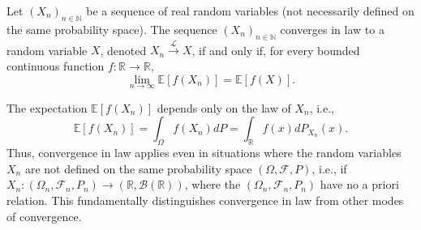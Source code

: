 \begin{definition}
Let $(X_n)_{n \in \mathbb{N}}$ be a sequence of real random variables (not necessarily defined on the same probability space). The sequence $(X_n)_{n \in \mathbb{N}}$ converges in law to a random variable $X$, denoted $X_n \xrightarrow{\mathcal{L}} X$, if and only if, for every bounded continuous function $f: \mathbb{R} \to \mathbb{R}$,
\[
\lim_{n \to \infty} \mathbb{E}[f(X_n)] = \mathbb{E}[f(X)].
\]
\end{definition}%

\begin{remark}
The expectation $\mathbb{E}[f(X_n)]$ depends only on the law of $X_n$, i.e.,
\[
\mathbb{E}[f(X_n)] = \int_{\Omega} f(X_n) dP = \int_{\mathbb{R}} f(x) dP_{X_n}(x).
\]
Thus, convergence in law applies even in situations where the random variables $X_n$ are not defined on the same probability space $(\Omega, \mathcal{F}, P)$, i.e., if $X_n: (\Omega_n, \mathcal{F}_n, P_n) \to (\mathbb{R}, \mathcal{B}(\mathbb{R}))$, where the $(\Omega_n, \mathcal{F}_n, P_n)$ have no a priori relation. This fundamentally distinguishes convergence in law from other modes of convergence.
\end{remark}
